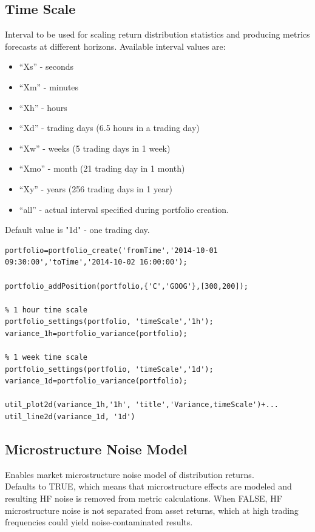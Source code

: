 \documentclass[letterpaper]{report}
\newcounter{N}
\begin{document}
\subsection{Time Scale}
Interval to be used for scaling return distribution statistics and producing metrics forecasts at different horizons. Available interval values are: 
\begin{itemize} 
  \item ``Xs'' - seconds
  \item ``Xm'' - minutes
  \item ``Xh'' - hours
  \item ``Xd'' - trading days (6.5 hours in a trading day)
  \item ``Xw'' - weeks (5 trading days in 1 week)
  \item ``Xmo'' - month (21 trading day in 1 month)
  \item ``Xy'' - years (256 trading days in 1 year)
  \item ``all'' - actual interval specified during portfolio creation.
\end{itemize}
Default value is "1d" - one trading day.
\begin{lstlisting}
portfolio=portfolio_create('fromTime','2014-10-01 09:30:00','toTime','2014-10-02 16:00:00');

portfolio_addPosition(portfolio,{'C','GOOG'},[300,200]);

% 1 hour time scale 
portfolio_settings(portfolio, 'timeScale','1h');
variance_1h=portfolio_variance(portfolio);

% 1 week time scale
portfolio_settings(portfolio, 'timeScale','1d');
variance_1d=portfolio_variance(portfolio);

util_plot2d(variance_1h,'1h', 'title','Variance,timeScale')+...
util_line2d(variance_1d, '1d')
\end{lstlisting}

\subsection{Microstructure Noise Model}
Enables market microstructure noise model of distribution returns.\\
Defaults to TRUE, which means that microstructure effects are modeled and resulting HF noise is removed from metric calculations. 
When FALSE, HF microstructure noise is not separated from asset returns, which at high trading frequencies could yield noise-contaminated results.
\end{document}
